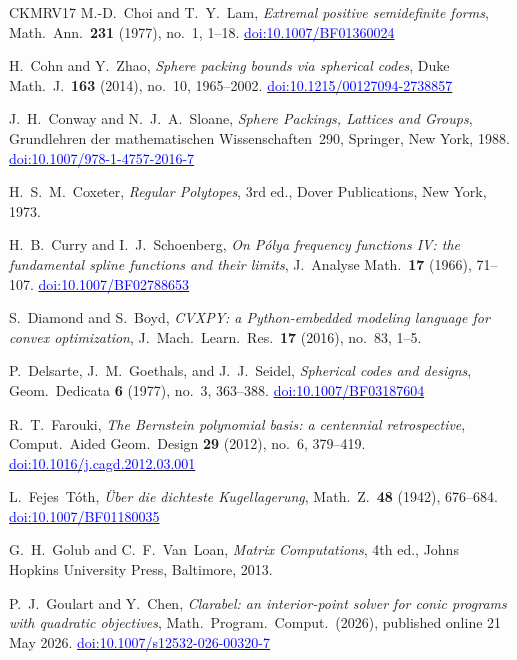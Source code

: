 \documentclass[11pt,reqno]{amsart}
\newcommand{\bluelink}[2]{\href{#1}{\textcolor{blue}{#2}}}
\renewcommand{\_}{\origunderscore\allowbreak}
\numberwithin{equation}{section}
\theoremstyle{plain}
\theoremstyle{definition}
\theoremstyle{remark}
\begin{document}
\begin{thebibliography}{CKMRV17}
M.-D.~Choi and T.~Y.~Lam,
\textit{Extremal positive semidefinite forms},
Math.\ Ann.\ \textbf{231} (1977), no.~1, 1--18.
\bluelink{https://doi.org/10.1007/BF01360024}{doi:10.1007/BF01360024}

H.~Cohn and Y.~Zhao,
\textit{Sphere packing bounds via spherical codes},
Duke Math.\ J.\ \textbf{163} (2014), no.~10, 1965--2002.
\bluelink{https://doi.org/10.1215/00127094-2738857}{doi:10.1215/00127094-2738857}

J.~H.~Conway and N.~J.~A.~Sloane,
\textit{Sphere Packings, Lattices and Groups},
Grundlehren der mathematischen Wissenschaften~290,
Springer, New York, 1988.
\bluelink{https://doi.org/10.1007/978-1-4757-2016-7}{doi:10.1007/978-1-4757-2016-7}

H.~S.~M.~Coxeter,
\textit{Regular Polytopes}, 3rd ed.,
Dover Publications, New York, 1973.

H.~B.~Curry and I.~J.~Schoenberg,
\textit{On {P}\'olya frequency functions {IV}: the fundamental spline functions
and their limits},
J.\ Analyse Math.\ \textbf{17} (1966), 71--107.
\bluelink{https://doi.org/10.1007/BF02788653}{doi:10.1007/BF02788653}

S.~Diamond and S.~Boyd,
\textit{CVXPY: a Python-embedded modeling language for convex optimization},
J.\ Mach.\ Learn.\ Res.\ \textbf{17} (2016), no.~83, 1--5.

P.~Delsarte, J.~M.~Goethals, and J.~J.~Seidel,
\textit{Spherical codes and designs},
Geom.\ Dedicata \textbf{6} (1977), no.~3, 363--388.
\bluelink{https://doi.org/10.1007/BF03187604}{doi:10.1007/BF03187604}

R.~T.~Farouki,
\textit{The {B}ernstein polynomial basis: a centennial retrospective},
Comput.\ Aided Geom.\ Design \textbf{29} (2012), no.~6, 379--419.
\bluelink{https://doi.org/10.1016/j.cagd.2012.03.001}{doi:10.1016/j.cagd.2012.03.001}

L.~Fejes~T\'oth,
\textit{\"Uber die dichteste Kugellagerung},
Math.\ Z.\ \textbf{48} (1942), 676--684.
\bluelink{https://doi.org/10.1007/BF01180035}{doi:10.1007/BF01180035}

G.~H.~Golub and C.~F.~Van~Loan,
\textit{Matrix Computations}, 4th ed.,
Johns Hopkins University Press, Baltimore, 2013.

P.~J.~Goulart and Y.~Chen,
\textit{Clarabel: an interior-point solver for conic programs with quadratic objectives},
Math.\ Program.\ Comput.\ (2026), published online 21 May 2026.
\bluelink{https://doi.org/10.1007/s12532-026-00320-7}{doi:10.1007/s12532-026-00320-7}


\end{thebibliography}
\end{document}
